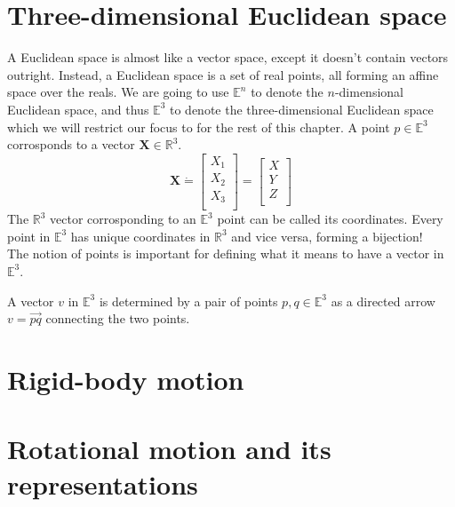 \documentclass{book}
\begin{document}
\section{Three-dimensional Euclidean space}
A Euclidean space is almost like a vector space, except it doesn't contain vectors outright.
Instead, a Euclidean space is a set of real points, all forming an affine space over the reals.
We are going to use $\mathbb{E}^n$ to denote the $n$-dimensional Euclidean space, and thus $\mathbb{E}^3$ to denote the three-dimensional Euclidean space which we will restrict our focus to for the rest of this chapter.
A point $p \in \mathbb{E}^3$ corrosponds to a vector $\mathbf{X} \in \mathbb{R}^3$.
\begin{equation*}
    \mathbf{X} \dot{=}
    \begin{bmatrix}
        X_1 \\
        X_2 \\
        X_3 \\
    \end{bmatrix}
    = 
    \begin{bmatrix}
        X \\
        Y \\
        Z \\
    \end{bmatrix}
\end{equation*}
The $\mathbb{R}^3$ vector corrosponding to an $\mathbb{E}^3$ point can be called its coordinates.
Every point in $\mathbb{E}^3$ has unique coordinates in $\mathbb{R}^3$ and vice versa, forming a bijection!\\
The notion of points is important for defining what it means to have a vector in $\mathbb{E}^3$.

\theoremstyle{definition}
\begin{definition}[Vector]
    A vector $v$ in $\mathbb{E}^3$ is determined by a pair of points $p,q \in \mathbb{E}^3$ as a directed arrow $v = \vec{pq}$ connecting the two points.
\end{definition}



\section{Rigid-body motion}

\section{Rotational motion and its representations}
\end{document}
